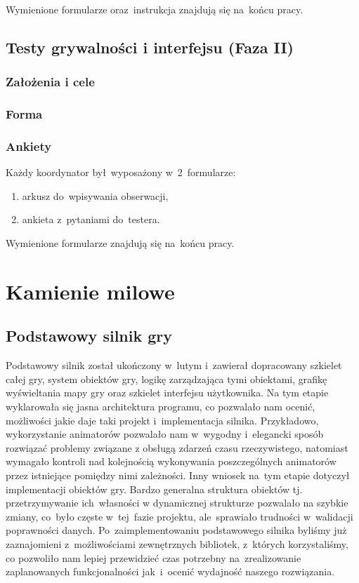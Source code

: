 \documentclass[licencjacka]{pracamgr}
\begin{document}
      \noindent
      Wymienione formularze oraz~instrukcja znajdują się na~końcu pracy.

    \section{Testy grywalności i interfejsu (Faza II)}
    
      \subsection{Założenia i cele}
      
      \subsection{Forma}
    
      \subsection{Ankiety}
      Każdy koordynator był~wyposażony w~2~formularze:
      \begin{enumerate}
	\item arkusz do~wpisywania obserwacji,
	\item ankieta z~pytaniami do~testera.
      \end{enumerate}
      
      \noindent
      Wymienione formularze znajdują się na~końcu pracy.

\chapter{Kamienie milowe}
  \section{Podstawowy silnik gry}
  Podstawowy silnik został ukończony w~lutym i~zawierał dopracowany szkielet całej gry, system obiektów gry,
  logikę zarządzająca tymi obiektami, grafikę wyświeltania mapy gry oraz szkielet interfejsu użytkownika.
  Na tym etapie wyklarowała się jasna architektura programu, co pozwalało nam ocenić, możliwości jakie
  daje taki projekt i~implementacja silnika. Przykładowo, wykorzystanie animatorów pozwalało nam w~wygodny
  i~elegancki sposób rozwiązać problemy związane z obsługą zdarzeń czasu rzeczywistego, natomiast wymagało kontroli
  nad kolejnością wykonywania poszczególnych animatorów przez istniejące pomiędzy nimi zależności. Inny wniosek
  na~tym etapie dotyczył implementacji obiektów gry. Bardzo generalna struktura obiektów tj. przetrzymywanie 
  ich~własności w dynamicznej strukturze pozwalało na szybkie zmiany, co~było częste w~tej~fazie projektu, 
  ale~sprawiało trudności w~walidacji poprawności danych.
  Po~zaimplementowaniu podstawowego silnika byliśmy już zaznajomieni z~możliwościami zewnętrznych bibliotek,
  z~których korzystaliśmy, co pozwoliło nam lepiej przewidzieć czas potrzebny na~zrealizowanie zaplanowanych
  funkcjonalności jak~i~ocenić wydajność naszego rozwiązania.
  
\end{document}

